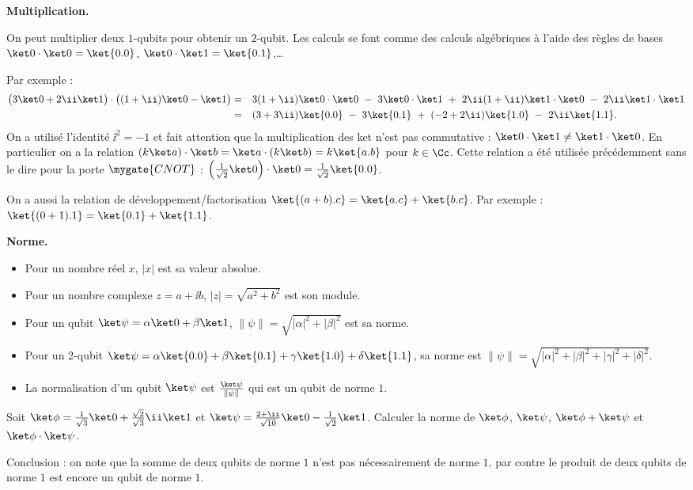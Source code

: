 \documentclass[11pt,class=report,crop=false]{standalone}
\begin{document}
\medskip

\textbf{Multiplication.}

On peut multiplier deux $1$-qubits pour obtenir un $2$-qubit. Les calculs se font comme des calculs algébriques à l'aide des règles de bases $\ket0 \cdot \ket 0 = \ket{0.0}$, $\ket0 \cdot \ket 1 = \ket{0.1}$,\ldots

Par exemple :
\begin{align*}
\big(3\ket0 + 2\ii\ket1\big)\cdot\big((1+\ii)\ket0-\ket1\big)
=\quad&  3(1+\ii)\ket0\cdot\ket0 \   - \  3\ket0\cdot\ket1 \   + \   2\ii(1+\ii)\ket1\cdot\ket0 \   - \  2\ii\ket1\cdot\ket1 \\
=\quad& (3+3\ii)\ket{0.0} \ - \  3\ket{0.1} \   + \   (-2+2\ii)\ket{1.0} \   - \   2\ii\ket{1.1}.
\end{align*}
On a utilisé l'identité $\ii^2 = -1$ et fait attention que la multiplication des \og{}ket\fg{} n'est pas commutative : $\ket0\cdot\ket1 \neq \ket1\cdot\ket0$.
En particulier on a la relation $(k\ket a)\cdot \ket b = \ket a\cdot (k\ket b) = k \ket{a.b}$ pour $k\in \Cc$.
Cette relation a été utilisée précédemment sans le dire pour la porte $\mygate{CNOT}$ :
$\left(\frac1{\sqrt2}\ket0\right)\cdot \ket0 = \frac1{\sqrt2} \ket{0.0}$.

On a aussi la relation de développement/factorisation $\ket{(a+b).c} = \ket{a.c} + \ket{b.c}$. Par exemple : $\ket{(0+1).1} = \ket{0.1}+\ket{1.1}$.


\bigskip
\textbf{Norme.}
\begin{itemize}
  \item Pour un nombre réel $x$,  $|x|$ est sa valeur absolue.
  \item Pour un nombre complexe $z=a+\ii b$, $|z|=\sqrt{a^2+b^2}$ est son module.
  \item Pour un qubit $\ket\psi = \alpha\ket0+\beta\ket1$, $\|\psi\| = \sqrt{|\alpha|^2+|\beta|^2}$ est sa norme.
  \item Pour un 2-qubit $\ket\psi = \alpha\ket{0.0}+\beta\ket{0.1}+\gamma\ket{1.0}+\delta\ket{1.1}$, sa norme est $\|\psi\| = \sqrt{|\alpha|^2+|\beta|^2+|\gamma|^2+|\delta|^2}$.
  \item La normalisation d'un qubit $\ket\psi$ est $\frac{\ket\psi}{\|\psi\|}$ qui  est un qubit de norme $1$.
\end{itemize}

\begin{exercicecours}
Soit $\ket\phi = \frac{1}{\sqrt3}\ket0 +\frac{\sqrt2}{\sqrt3}\ii\ket1$ et $\ket \psi = \frac{2+\ii}{\sqrt{10}}\ket0 - \frac{1}{\sqrt2}\ket1$.
Calculer la norme de $\ket \phi$, $\ket \psi$, $\ket\phi+\ket\psi$ et $\ket\phi\cdot\ket\psi$.

Conclusion : on note que la somme de deux qubits de norme $1$ n'est pas nécessairement de norme $1$, par contre le produit de deux qubits de norme $1$ est encore un qubit de norme $1$.
\end{exercicecours}
\end{document}
